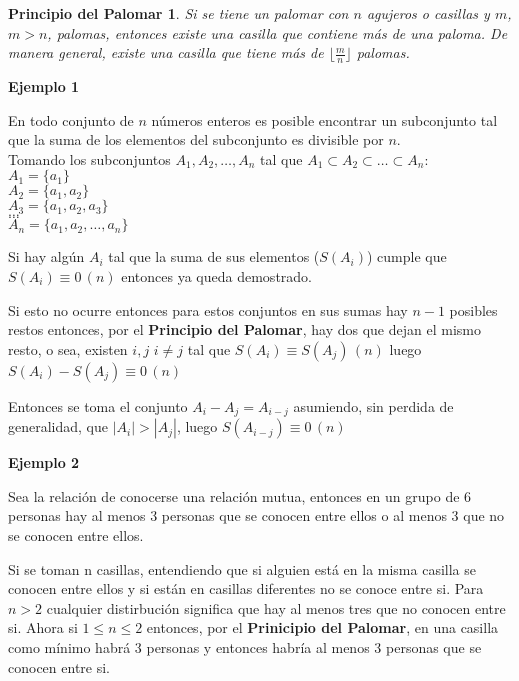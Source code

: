 \documentclass[a4paper,12pt]{report}
\newtheorem*{ppa}{Principio del Palomar}
\begin{document}
\begin{ppa}
 Si se tiene un palomar con $n$ agujeros o casillas y $m$, $m>n$, palomas, entonces existe una casilla que contiene más de una paloma. De manera general, existe una casilla que tiene más de $\lfloor\frac{m}{n}\rfloor$ palomas.
\end{ppa}

\textbf{Ejemplo 1}

 En todo conjunto de $n$ números enteros es posible encontrar un subconjunto tal que la suma de los elementos del subconjunto es divisible por $n$.\\

 Tomando los subconjuntos $A_1,A_2,\dots,A_n$ tal que $A_1\subset A_2 \subset\dots\subset A_n$:\\
 $A_1=\{a_1\}$\\
 $A_2=\{a_1,a_2\}$\\  
 $A_3=\{a_1,a_2,a_3\}$\\
 $\dots$\\
 $\dots$\\
 $A_n=\{a_1,a_2,\dots,a_n\}$
 
 Si hay algún $A_i$ tal que la suma de sus elementos ($S(A_i)$) cumple que $S(A_i)\equiv 0 \, (n)$ entonces ya queda demostrado.
 
 Si esto no ocurre entonces para estos conjuntos en sus sumas hay $n-1$ posibles restos entonces, por el \textbf{Principio del Palomar}, hay dos que dejan el mismo resto, o sea,
 existen $i,j$ $i\neq j$ tal que $S(A_i)\equiv S(A_j) \, (n)$ luego $S(A_i) - S(A_j)\equiv 0 \, (n)$
 
 Entonces se toma el conjunto $A_i - A_j = A_{i-j}$ asumiendo, sin perdida de generalidad, que $|A_i|>|A_j|$, luego $S(A_{i-j})\equiv 0 \, (n)$
 
 
 \textbf{Ejemplo 2}

 Sea la relación de conocerse una relación mutua, entonces en un grupo de 6 personas hay al menos 3 personas que se conocen entre ellos o al menos 3 que no se conocen entre ellos.
 
 Si se toman n casillas, entendiendo que si alguien está en la misma casilla se conocen entre ellos y si están en casillas diferentes no se conoce entre si. Para $n > 2$ cualquier distirbución significa que hay al menos tres que no conocen entre si. Ahora si $1\leq n \leq 2$
 entonces, por el \textbf{Prinicipio del Palomar}, en una casilla como mínimo habrá 3 personas y entonces habría al menos 3 personas que se conocen entre si.
 
 
\end{document}
